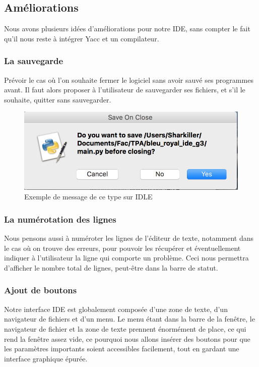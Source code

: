 \documentclass[a4paper,12pt]{article}
\begin{document}
	\subsection{Améliorations}
	Nous avons plusieurs idées d'améliorations pour notre IDE, sans compter le fait qu'il nous reste à intégrer Yacc et un compilateur. 
	
	\subsubsection*{La sauvegarde}
	
		Prévoir le cas où l'on souhaite fermer le logiciel sans avoir sauvé ses programmes avant. Il faut alors proposer à l'utilisateur de sauvegarder ses fichiers, et s'il le souhaite, quitter sans sauvegarder.
		
		\begin{figure}[h!]
			\begin{center}
				\includegraphics[scale=0.5]{images/save_on_close}
				\caption{Exemple de message de ce type sur IDLE}
			\end{center}
		\end{figure}
	
	\subsubsection*{La numérotation des lignes}
	
		Nous pensons aussi à numéroter les lignes de l'éditeur de texte, notamment dans le cas où on trouve des erreurs, pour pouvoir les récupérer et éventuellement indiquer à l'utilisateur la ligne qui comporte un problème. Ceci nous permettra d'afficher le nombre total de lignes, peut-être dans la barre de statut.
		
	\subsubsection*{Ajout de boutons}
		
		Notre interface IDE est globalement composée d'une zone de texte, d'un navigateur de fichiers et d'un menu. Le menu étant dans la barre de la fenêtre, le navigateur de fichier et la zone de texte prennent énormément de place, ce qui rend la fenêtre assez vide, ce pourquoi nous allons insérer des boutons pour que les paramètres importants soient accessibles facilement, tout en gardant une interface graphique épurée.
		
\end{document}
